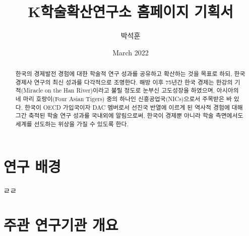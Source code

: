 \documentclass{article}
\begin{document}
\title{K학술확산연구소 홈페이지 기획서}
\author{박석훈}
\date{March 2022}
\maketitle

\tableofcontents

\begin{abstract}
    한국의 경제발전 경험에 대한 학술적 연구 성과를 공유하고 확산하는 것을 목표로 하되, 한국경제사 연구의 최신 성과를 다각적으로 조명한다. 해방 이후 75년간 한국 경제는 한강의 기적(Miracle on the Han River)이라고 불릴 정도로 눈부신 고도성장을 하였으며, 아시아의 네 마리 호랑이(Four Asian Tigers) 중의 하나인 신흥공업국(NICs)으로서 주목받은 바 있다. 한국이 OECD 가입국이자 DAC 멤버로서 선진국 반열에 이르게 된 역사적 경험에 대해 그간 축적된 학술 연구 성과를 국내외에 알림으로써, 한국이 경제뿐 아니라 학술 측면에서도 세계를 선도하는 위상을 가질 수 있도록 한다. \\
\end{abstract}



\section{연구 배경}
ㄹㄹ

\section{주관 연구기관 개요}
\end{document}
